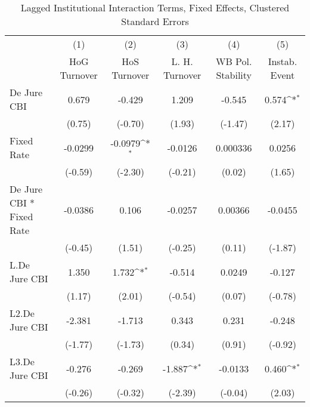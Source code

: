 {
\def\sym#1{\ifmmode^{#1}\else\(^{#1}\)\fi}
\begin{longtable}{l*{5}{c}}
\caption{Lagged Institutional Interaction Terms, Fixed Effects, Clustered Standard Errors \label{intlagsDJ}}\\
\hline\hline\endfirsthead\hline\endhead\hline\endfoot\endlastfoot
                &\multicolumn{1}{c}{(1)}&\multicolumn{1}{c}{(2)}&\multicolumn{1}{c}{(3)}&\multicolumn{1}{c}{(4)}&\multicolumn{1}{c}{(5)}\\
                &\multicolumn{1}{c}{HoG Turnover}&\multicolumn{1}{c}{HoS Turnover}&\multicolumn{1}{c}{L. H. Turnover}&\multicolumn{1}{c}{WB Pol. Stability}&\multicolumn{1}{c}{Instab. Event}\\
\hline
De Jure CBI     &    0.679         &   -0.429         &    1.209         &   -0.545         &    0.574\sym{*}  \\
                &   (0.75)         &  (-0.70)         &   (1.93)         &  (-1.47)         &   (2.17)         \\
[1em]
Fixed Rate      &  -0.0299         &  -0.0979\sym{*}  &  -0.0126         & 0.000336         &   0.0256         \\
                &  (-0.59)         &  (-2.30)         &  (-0.21)         &   (0.02)         &   (1.65)         \\
[1em]
De Jure CBI * Fixed Rate&  -0.0386         &    0.106         &  -0.0257         &  0.00366         &  -0.0455         \\
                &  (-0.45)         &   (1.51)         &  (-0.25)         &   (0.11)         &  (-1.87)         \\
[1em]
L.De Jure CBI   &    1.350         &    1.732\sym{*}  &   -0.514         &   0.0249         &   -0.127         \\
                &   (1.17)         &   (2.01)         &  (-0.54)         &   (0.07)         &  (-0.78)         \\
[1em]
L2.De Jure CBI  &   -2.381         &   -1.713         &    0.343         &    0.231         &   -0.248         \\
                &  (-1.77)         &  (-1.73)         &   (0.34)         &   (0.91)         &  (-0.92)         \\
[1em]
L3.De Jure CBI  &   -0.276         &   -0.269         &   -1.887\sym{*}  &  -0.0133         &    0.460\sym{*}  \\
                &  (-0.26)         &  (-0.32)         &  (-2.39)         &  (-0.04)         &   (2.03)         \\

\end{longtable}}
